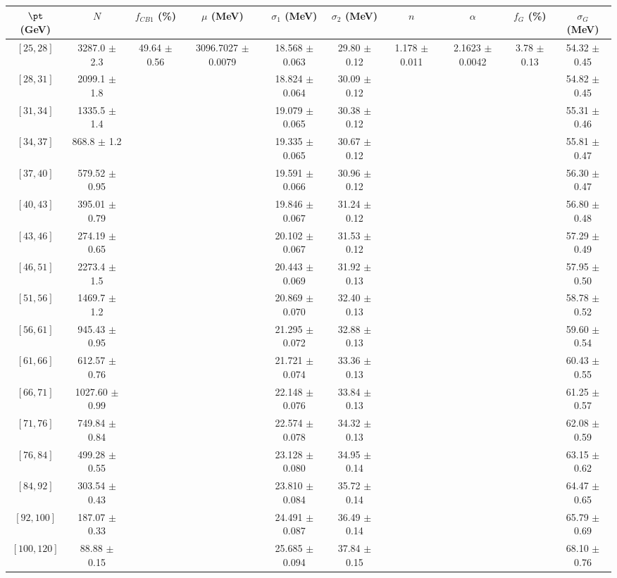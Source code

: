 \begin{tabular}{c||c|c|c|c|c|c|c|c|c}
$\pt$ (GeV) & $N$ & $f_{CB1}$ (\%)  & $\mu$ (MeV) & $\sigma_1$ (MeV) & $\sigma_2$ (MeV) & $n$ & $\alpha$ & $f_G$ (\%) & $\sigma_G$ (MeV) \\
\hline
$[25, 28]$ & 3287.0 $\pm$ 2.3 & \multirow{17}{*}{49.64 $\pm$ 0.56} & \multirow{17}{*}{3096.7027 $\pm$ 0.0079} & 18.568 $\pm$ 0.063 & 29.80 $\pm$ 0.12 & \multirow{17}{*}{1.178 $\pm$ 0.011} & \multirow{17}{*}{2.1623 $\pm$ 0.0042} & \multirow{17}{*}{3.78 $\pm$ 0.13} & 54.32 $\pm$ 0.45\\
$[28, 31]$ & 2099.1 $\pm$ 1.8 &  &  & 18.824 $\pm$ 0.064 & 30.09 $\pm$ 0.12 &  &  &  & 54.82 $\pm$ 0.45\\
$[31, 34]$ & 1335.5 $\pm$ 1.4 &  &  & 19.079 $\pm$ 0.065 & 30.38 $\pm$ 0.12 &  &  &  & 55.31 $\pm$ 0.46\\
$[34, 37]$ & 868.8 $\pm$ 1.2 &  &  & 19.335 $\pm$ 0.065 & 30.67 $\pm$ 0.12 &  &  &  & 55.81 $\pm$ 0.47\\
$[37, 40]$ & 579.52 $\pm$ 0.95 &  &  & 19.591 $\pm$ 0.066 & 30.96 $\pm$ 0.12 &  &  &  & 56.30 $\pm$ 0.47\\
$[40, 43]$ & 395.01 $\pm$ 0.79 &  &  & 19.846 $\pm$ 0.067 & 31.24 $\pm$ 0.12 &  &  &  & 56.80 $\pm$ 0.48\\
$[43, 46]$ & 274.19 $\pm$ 0.65 &  &  & 20.102 $\pm$ 0.067 & 31.53 $\pm$ 0.12 &  &  &  & 57.29 $\pm$ 0.49\\
$[46, 51]$ & 2273.4 $\pm$ 1.5 &  &  & 20.443 $\pm$ 0.069 & 31.92 $\pm$ 0.13 &  &  &  & 57.95 $\pm$ 0.50\\
$[51, 56]$ & 1469.7 $\pm$ 1.2 &  &  & 20.869 $\pm$ 0.070 & 32.40 $\pm$ 0.13 &  &  &  & 58.78 $\pm$ 0.52\\
$[56, 61]$ & 945.43 $\pm$ 0.95 &  &  & 21.295 $\pm$ 0.072 & 32.88 $\pm$ 0.13 &  &  &  & 59.60 $\pm$ 0.54\\
$[61, 66]$ & 612.57 $\pm$ 0.76 &  &  & 21.721 $\pm$ 0.074 & 33.36 $\pm$ 0.13 &  &  &  & 60.43 $\pm$ 0.55\\
$[66, 71]$ & 1027.60 $\pm$ 0.99 &  &  & 22.148 $\pm$ 0.076 & 33.84 $\pm$ 0.13 &  &  &  & 61.25 $\pm$ 0.57\\
$[71, 76]$ & 749.84 $\pm$ 0.84 &  &  & 22.574 $\pm$ 0.078 & 34.32 $\pm$ 0.13 &  &  &  & 62.08 $\pm$ 0.59\\
$[76, 84]$ & 499.28 $\pm$ 0.55 &  &  & 23.128 $\pm$ 0.080 & 34.95 $\pm$ 0.14 &  &  &  & 63.15 $\pm$ 0.62\\
$[84, 92]$ & 303.54 $\pm$ 0.43 &  &  & 23.810 $\pm$ 0.084 & 35.72 $\pm$ 0.14 &  &  &  & 64.47 $\pm$ 0.65\\
$[92, 100]$ & 187.07 $\pm$ 0.33 &  &  & 24.491 $\pm$ 0.087 & 36.49 $\pm$ 0.14 &  &  &  & 65.79 $\pm$ 0.69\\
$[100, 120]$ & 88.88 $\pm$ 0.15 &  &  & 25.685 $\pm$ 0.094 & 37.84 $\pm$ 0.15 &  &  &  & 68.10 $\pm$ 0.76\\
\end{tabular}
